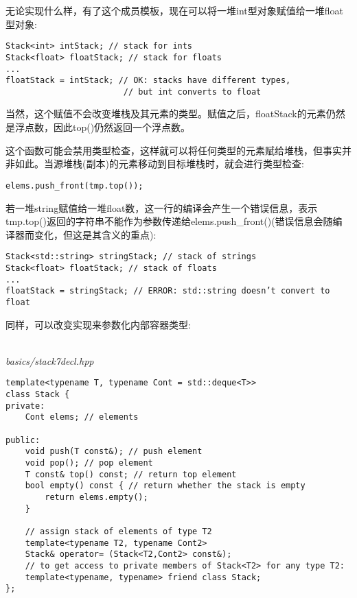无论实现什么样，有了这个成员模板，现在可以将一堆int型对象赋值给一堆float型对象:

\begin{lstlisting}[style=styleCXX]
Stack<int> intStack; // stack for ints
Stack<float> floatStack; // stack for floats
...
floatStack = intStack; // OK: stacks have different types,
						// but int converts to float
\end{lstlisting}

当然，这个赋值不会改变堆栈及其元素的类型。赋值之后，floatStack的元素仍然是浮点数，因此top()仍然返回一个浮点数。

这个函数可能会禁用类型检查，这样就可以将任何类型的元素赋给堆栈，但事实并非如此。当源堆栈(副本)的元素移动到目标堆栈时，就会进行类型检查:

\begin{lstlisting}[style=styleCXX]
elems.push_front(tmp.top());
\end{lstlisting}

若一堆string赋值给一堆float数，这一行的编译会产生一个错误信息，表示tmp.top()返回的字符串不能作为参数传递给elems.push\_front()(错误信息会随编译器而变化，但这是其含义的重点):

\begin{lstlisting}[style=styleCXX]
Stack<std::string> stringStack; // stack of strings
Stack<float> floatStack; // stack of floats
...
floatStack = stringStack; // ERROR: std::string doesn’t convert to float
\end{lstlisting}

同样，可以改变实现来参数化内部容器类型:

\hspace*{\fill} \\ %
\noindent
\textit{basics/stack7decl.hpp}
\begin{lstlisting}[style=styleCXX]
template<typename T, typename Cont = std::deque<T>>
class Stack {
private:
	Cont elems; // elements
	
public:
	void push(T const&); // push element
	void pop(); // pop element
	T const& top() const; // return top element
	bool empty() const { // return whether the stack is empty
		return elems.empty();
	}

	// assign stack of elements of type T2
	template<typename T2, typename Cont2>
	Stack& operator= (Stack<T2,Cont2> const&);
	// to get access to private members of Stack<T2> for any type T2:
	template<typename, typename> friend class Stack;
};
\end{lstlisting}

